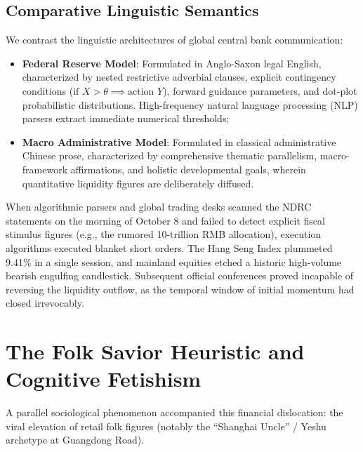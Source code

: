 \documentclass[11pt,a4paper]{article}
\begin{document}
\subsection{Comparative Linguistic Semantics}

We contrast the linguistic architectures of global central bank communication:
\begin{itemize}
    \item \textbf{Federal Reserve Model}: Formulated in Anglo-Saxon legal English, characterized by nested restrictive adverbial clauses, explicit contingency conditions ($\text{if } X > \theta \implies \text{action } Y$), forward guidance parameters, and dot-plot probabilistic distributions. High-frequency natural language processing (NLP) parsers extract immediate numerical thresholds;
    \item \textbf{Macro Administrative Model}: Formulated in classical administrative Chinese prose, characterized by comprehensive thematic parallelism, macro-framework affirmations, and holistic developmental goals, wherein quantitative liquidity figures are deliberately diffused.
\end{itemize}

When algorithmic parsers and global trading desks scanned the NDRC statements on the morning of October 8 and failed to detect explicit fiscal stimulus figures (e.g., the rumored 10-trillion RMB allocation), execution algorithms executed blanket short orders. The Hang Seng Index plummeted 9.41\% in a single session, and mainland equities etched a historic high-volume bearish engulfing candlestick. Subsequent official conferences proved incapable of reversing the liquidity outflow, as the temporal window of initial momentum had closed irrevocably.

\section{The Folk Savior Heuristic and Cognitive Fetishism}

A parallel sociological phenomenon accompanied this financial dislocation: the viral elevation of retail folk figures (notably the ``Shanghai Uncle'' / Yeshu archetype at Guangdong Road). 
\end{document}
